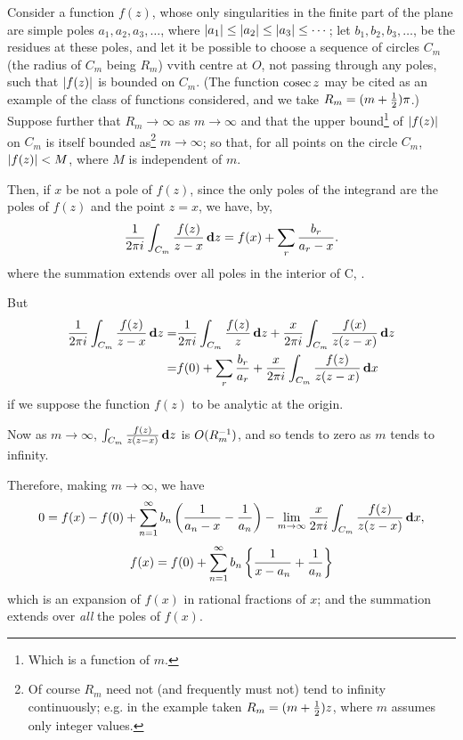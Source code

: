 Consider a function $f(z)$, whose only singularities in the finite
part of the plane are simple poles $a_{1},a_{2},a_{3},\ldots$, where
$\left| a_{1} \right| \leq \left| a_{2} \right| \leq \left| a_{3} \right| \leq \cdots$;
let $b_{1},b_{2},b_{3},\ldots$, be the residues at these
poles, and let it be possible to choose a sequence of circles $C_{m}$ (the
radius of $C_{m}$ being $R_{m}$) vvith centre at $O$, not passing through any
poles, such that $\left| f(z) \right|$ is bounded on $C_{m}$. (The function
$\operatorname{cosec} z$ may
be cited as an example of the class of functions considered, and we
take $R_{m} = (m + \frac{1}{2})\pi$.) Suppose further that
$R_{m} \rightarrow \infty$ as $m \rightarrow \infty$ and that
the upper bound\footnote{Which is a function of $m$.}
of $\left| f(z) \right|$ on $C_{m}$ is itself bounded
as\footnote{Of course $R_{m}$ need not (and frequently must not) tend to infinity
  continuously; e.g. in the example taken
  $R_{m} = (m+\frac{1}{2})z$, where $m$ assumes only integer values.}
$m\rightarrow\infty$; so
that, for all points on the circle $C_{m}$, $\left| f(z) \right| < M$, where $M$ is
independent of $m$.

Then, if $x$ be not a pole of $f(z)$, since the only poles of the
integrand are the poles of $f(z)$ and the point $z = x$, we have, by,
$$
\frac{1}{2 \pi i} \int_{C_{m}} \frac{f(z)}{z-x} \, \mathbf{d} z
=
f(x) + \sum_{r} \frac{b_{r}}{a_{r}-x}.
$$
where the summation extends over all poles in the interior of C, .

But
\begin{align*}
  \frac{1}{2 \pi i}
  \int_{C_{m}} \frac{f(z)}{z-x} \, \mathbf{d} z
  =&
  \frac{1}{2 \pi i}
  \int_{C_{m}} \frac{f(z)}{z} \, \mathbf{d} z
  +
  \frac{x}{2 \pi i}
  \int_{C_{m}} \frac{f(x)}{z(z-x)} \, \mathbf{d} z
  \\
  =&
  f(0) + \sum_{r} \frac{b_{r}}{a_{r}}
  +
  \frac{x}{2 \pi i}
  \int_{C_{m}} \frac{f(z)}{z(z-x)} \, \mathbf{d} x
\end{align*}
if we suppose the function $f(z)$ to be analytic at the origin.

Now as $m \rightarrow \infty$,
$\int_{C_{m}} \frac{f(z)}{z(z-x)} \, \mathbf{d} z$ is
$O(R_{m}^{-1})$, and so tends to zero as
$m$ tends to infinity.

Therefore, making $m \rightarrow \infty$, we have
$$
0
=
f(x) - f(0)
+
\sum_{n=1}^{\infty}
b_{n} \left( 
  \frac{1}{a_{n}-x} - \frac{1}{a_{n}}
 \right)
-
\lim_{m\rightarrow\infty}
\frac{x}{2 \pi i}
\int_{C_{m}} \frac{f(z)}{z(z-x)} \, \mathbf{d} x,
$$
\ie
$$
f(x) = f(0)
+
\sum_{n=1}^{\infty}
b_{n}
\left\{ 
  \frac{1}{x-a_{n}} + \frac{1}{a_{n}}
 \right\}
$$
which is an expansion of $f(x)$ in rational fractions of $x$; and the
summation extends over \emph{all} the poles of $f(x)$.

